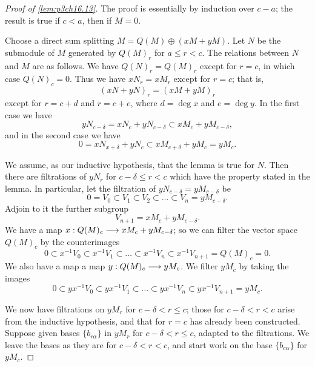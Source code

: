 \documentclass[../main]{subfiles}
\begin{document}
\begin{proof}[Proof of \ref{lem:p3ch16.13}]
The proof is essentially by induction over $c - a$; the result is true if $c < a$, then if $M = 0$.

Choose a direct sum splitting $M = Q(M) \oplus (xM + y M)$. Let $N$ be the submodule of $M$ generated by $Q(M)_r$ for $a \le r < c$. The relations between $N$ and $M$ are as follows. We have $Q(N)_r = Q(M)_r$ except for $r = c$, in which case $Q(N)_c = 0$. Thus we have $x N_r = x M_r$ except for $r = c$; that is, $$(x N + y N)_r = (x M + y M)_r$$ except for $r = c + d$ and $r = c + e$, where $d = \deg x$ and $e = \deg y$. In the first case we have $$y N_{c - \delta} = x N_c + y N_{c - \delta} \subset x M_c + y M_{c - \delta},$$ and in the second case we have $$0 = x N_{x + \delta} + y N_c \subset x M_{c + \delta} + y M_c = y M_c.$$ 

We assume, as our inductive hypothesis, that the lemma is true for $N$. Then there are filtrations of $y N_r$ for $c - \delta \le r < c$ which have the property stated in the lemma. In particular, let the filtration of $y N_{c - \delta} = y M_{c - \delta}$ be $$0 = V_0 \subset V_1 \subset V_2 \subset \ldots \subset V_n = y M_{c - \delta}.$$ Adjoin to it the further subgroup $$V_{n + 1} = x M_c + y M_{c - \delta}.$$ We have a map $x : Q(M)_c \overset{}{\longrightarrow} x M_c + y M_{c - \delta}$; so we can filter the vector space $Q(M)_c$ by the counterimages $$0 \subset x^{-1} V_0 \subset x^{-1} V_1 \subset \ldots \subset x^{-1} V_n \subset x^{-1} V_{n + 1} = Q(M)_c = 0.$$ We also have a map a map $y : Q(M)_c \overset{}{\longrightarrow} y M_c$. We filter $y M_c$ by taking the images $$0 \subset y x^{-1} V_0 \subset y x^{-1} V_1 \subset \ldots \subset y x^{-1} V_n \subset y x^{-1} V_{n + 1} = y M_c.$$

We now have filtrations on $y M_r$ for $c - \delta < r \le c$; those for $c - \delta < r < c$ arise from the inductive hypothesis, and that for $r = c$ has already been constructed. Suppose given bases $\{b_{r \alpha}\}$ in $y M_r$ for $c - \delta < r \le c$, adapted to the filtrations. We leave the bases as they are for $c - \delta < r < c$, and start work on the base $\{b_{c \alpha}\}$ for $y M_c$. 


\end{proof}
\end{document}
